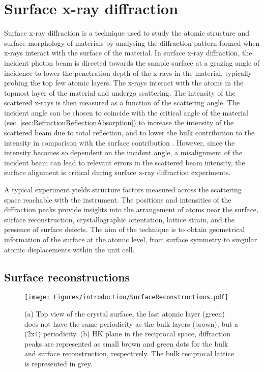 \section{Surface x-ray diffraction} \label{sec:SXRD}

Surface x-ray diffraction is a technique used to study the atomic structure and surface morphology of materials by analysing the diffraction pattern formed when x-rays interact with the surface of the material.
In surface x-ray diffraction, the incident photon beam is directed towards the sample surface at a grazing angle of incidence to lower the penetration depth of the x-rays in the material, typically probing the top few atomic layers.
The x-rays interact with the atoms in the topmost layer of the material and undergo scattering.
The intensity of the scattered x-rays is then measured as a function of the scattering angle.
The incident angle can be chosen to coincide with the critical angle of the material (sec. \ref{sec:RefractionReflectionAbsorption}) to increase the intensity of the scattered beam due to total reflection, and to lower the bulk contribution to the intensity in comparison with the surface contribution \parencite{Feidenhansl1989, Moritz2022}.
However, since the intensity becomes so dependent on the incident angle, a misalignment of the incident beam can lead to relevant errors in the scattered beam intensity, the surface alignment is critical during surface x-ray diffraction experiments.

A typical experiment yields structure factors measured across the scattering space reachable with the instrument.
The positions and intensities of the diffraction peaks provide insights into the arrangement of atoms near the surface, surface reconstruction, crystallographic orientation, lattice strain, and the presence of surface defects.
The aim of the technique is to obtain geometrical information of the surface at the atomic level, from surface symmetry to singular atomic displacements within the unit cell.

\subsection{Surface reconstructions} \label{sec:SurfaceReconstructions}

\begin{figure}[!htb]
    \centering
    \texttt{[image: Figures/introduction/SurfaceReconstructions.pdf]}
    \caption{
    (a) Top view of the crystal surface, the last atomic layer (green) does not have the same periodicity as the bulk layers (brown), but a (2x4) periodicity.
    (b) HK plane in the reciprocal space, diffraction peaks are represented as small brown and green dots for the bulk and surface reconstruction, respectively. The bulk reciprocal lattice is represented in grey.
    }
    \label{fig:SurfaceReconstructions}
\end{figure}


